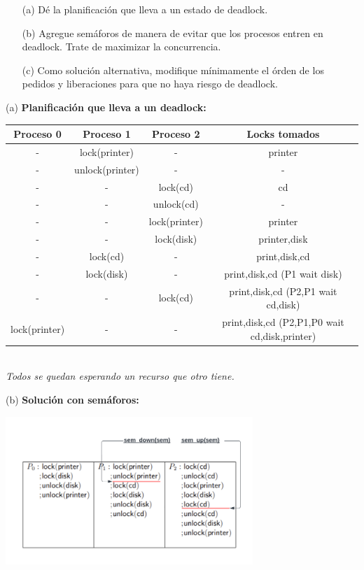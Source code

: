 \documentclass[12pt]{article}
\begin{document}
\begin{itemize}
    \item[(a)] Dé la planificación que lleva a un estado de deadlock.
    \item[(b)] Agregue semáforos de manera de evitar que los procesos entren en deadlock. Trate de maximizar la concurrencia.
    \item[(c)] Como solución alternativa, modifique mínimamente el órden de los pedidos y liberaciones para que no haya riesgo de deadlock.
\end{itemize}

\begin{rta}
    \item[(a)] \textbf{Planificación que lleva a un deadlock:} \newline
    \begin{tabular}{|c|c|c|c|}
        \hline
        \rowcolor{cyan!20} %
        \textbf{Proceso 0} & \textbf{Proceso 1} & \textbf{Proceso 2} & \textbf{Locks tomados}  \\
        \hline\hline
        - & lock(printer) & - & printer \\
        \hline
        - & unlock(printer) & - & - \\   
        \hline
        - & - & lock(cd) & cd \\
        \hline
        - & - & unlock(cd) & - \\
        \hline
        - & - & lock(printer) & printer \\
        \hline
        - & - & lock(disk) & printer,disk \\
        \hline
        - & lock(cd) & - & print,disk,cd \\
        \hline
        - & lock(disk) & - & print,disk,cd (P1 wait disk) \\
        \hline
        - & - & lock(cd) & print,disk,cd (P2,P1 wait cd,disk) \\
        \hline
        lock(printer) & - & - & print,disk,cd (P2,P1,P0 wait cd,disk,printer) \\
        \hline
    \end{tabular} \\
    \textit{Todos se quedan esperando un recurso que otro tiene.} 
    \newpage
    \item[(b)] \textbf{Solución con semáforos:} \newline
    \begin{center}
        \includegraphics[width=0.7\textwidth]{c13.pdf}

\end{center}
\end{rta}
\end{document}

